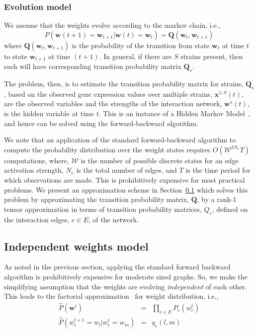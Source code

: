 \documentclass{bioinfo}
\begin{document}
\begin{methods}
\subsubsection{Evolution model }
\label{sec:evolution-model}
We assume that the weights evolve according to the markov chain, i.e.,
\begin{equation}
  \label{eq:q-evol}
 P(\mathbf{w}(t+1) = \mathbf{w}_{t+1} |  \mathbf{w}(t) = \mathbf{w}_{t}) = \mathbf{Q}(\mathbf{w}_{t}, \mathbf{w}_{t+1})
\end{equation}
where $\mathbf{Q}(\mathbf{w}_{t}, \mathbf{w}_{t+1})$ is the probability of the
transition from state $\mathbf{w}_{t}$ at time $t$ to state
$\mathbf{w}_{t+1}$ at time $(t+1)$. In general, if there are $S$
strains present, then each will have corresponding transition
probability matrix $\mathbf{Q}_{s}$. 

 
The problem, then, is to estimate the transition probability matrix for
strains, $\mathbf{Q}_{s}$, based on the observed gene expression values over
multiple strains, $\mathbf{x}^{1:S}(t)$, are the observed variables
and the strengths of the interaction network, $\mathbf{w}^{s}(t)$, is  the
hidden variable at time $t$. This is an instance of a Hidden Markov
Model~\citep{Rabiner89hmm},  and hence can be solved using the forward-backward algorithm.


We note that an application of the standard forward-backward algorithm
to compute the probability distribution over the weight states
requires $O({\mathcal W}^{2 N_{e}}T)$ computations, where, ${\mathcal
  W}$ is the number of possible discrete states for an edge activation
strength, $N_{e}$ is the total number of edges, and $T$ is the time
period for which observations are made.  This is prohibitively
expensive for most practical problems. We present an approximation
scheme in Section~\ref{sec:factorial-model} which solves this problem
by approximating the transition probability matrix, $\mathbf{Q}$, by a rank-1
tensor approximation in terms of transition probability matrices,
$Q_{e}$, defined on the interaction edges, $e\in E$, of the network. 

\subsection{Independent weights model}
\label{sec:factorial-model}
As noted in the previous section, applying the standard forward
backward algorithm is prohibitively expensive for moderate sized
graphs. So, we make the simplifying assumption that the weights are
evolving \emph{independent} of each other. This leads to the factorial
approximation~\citep{DBLP:journals/ml/GhahramaniJ97,Mclachlan97embook} for weight distribution, i.e.,  
\begin{eqnarray}
  \label{eq:q_mf}
  \hat{P}({\mathbf w}^{t}) &=& \prod_{e\in E} P_{e}(w_{e}^{t}) \\
  \hat{P}(w_{e}^{t+1} = w_{l} | w_{e}^{t} = w_{m}) &=& q_{e}(l, m)
\end{eqnarray}


\end{methods}
\end{document}
